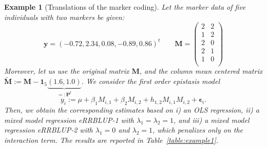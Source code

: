 \documentclass{bmcart}
\newtheorem{example}{Example}
\newcommand{\M}{\mathbf{M}}
\newcommand{\0}{\mathbf{0}}
\renewcommand{\P}{\mathbf{P}}
\begin{document}
\begin{example}[Translations of the marker coding]\label{ex:06}
	Let the marker data of five individuals with two markers be given:
	$$\mathbf{y}= (-0.72,2.34,0.08,-0.89,0.86)^t \qquad 
	\M = \begin{pmatrix}
	2 & 2 \\
	1 & 2 \\
	2 & 0 \\
	2 & 1 \\
	1 & 0 \\
	\end{pmatrix} $$ 
	Moreover, let us use the original matrix $\M$, and the column mean centered matrix $\tilde{\M}:= \M - \mathbf{1}_5 \underbrace{(1.6,1.0)}_{=:\P^t}$.
	We consider the first order epistasis model $$y_i := \mu + \beta_1 M_{i,1} + \beta_2 M_{i,2}  + h_{1,2} M_{i,1}M_{i,2} + \bm{\epsilon}_i.$$
	Then, we obtain  the corresponding estimates based on i) an OLS regression, ii) a mixed model regression eRRBLUP-1 with $\lambda_1=\lambda_2=1$, and iii) a mixed model regression eRRBLUP-2 with $\lambda_1=0$ and $\lambda_2=1$, which penalizes only on the interaction term. The results are reported in Table~\ref{table:example1}. \\



\end{example}
\end{document}
